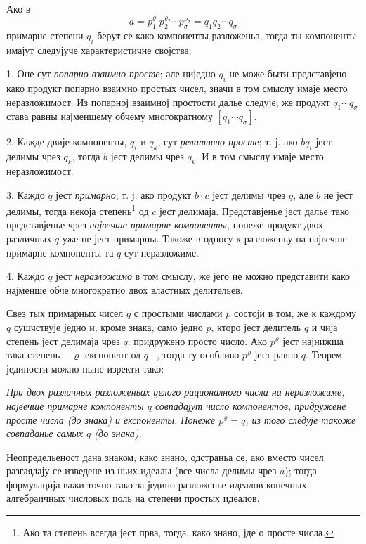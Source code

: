 ﻿\documentclass[11pt]{article}
\begin{document}
Ако в
\[
 a=p_1^{\varrho_1}p_2^{\varrho_2}\cdots p_\sigma^{\varrho_\sigma}=q_1q_2\cdots q_\sigma
\]
примарне степени \(q_i\) берут се како компоненты разложеньа, тогда ты компоненты имајут следујуче характеристичне својства:

1. Оне сут \emph{попарно взаимно просте}; але ниједно \(q_i\) не може быти представјено како продукт попарно взаимно простых чисел, значи в том смыслу имаје место неразложимост. Из попарној взаимној простости далье следује, же продукт \(q_1\cdots q_\sigma\) става равны најменшему обчему многократному \([q_1\cdots q_\sigma]\).

2. Кажде двије компоненты, \(q_i\) и \(q_k\), сут \emph{релативно просте}; т. ј. ако \(bq_i\) јест делимы чрез \(q_k\), тогда \(b\) јест делимы чрез \(q_k\). И в том смыслу имаје место неразложимост.

3. Каждо \(q\) јест \emph{примарно}; т. ј. ако продукт \(b\cdot c\) јест делимы чрез \(q\), але \(b\) не јест делимы, тогда некоја степень\footnote{Ако та степень всегда јест прва, тогда, како знано, јде о просте числа.} од \(c\) јест делимаја. Представјенье јест далье тако представјенье чрез \emph{највечше примарне компоненты}, понеже продукт двох различных \(q\) уже не јест примарны. Такоже в односу к разложеньу на највечше примарне компоненты та \(q\) сут неразложиме.

4. Каждо \(q\) јест \emph{неразложимо} в том смыслу, же јего не можно представити како најменше обче многократно двох властных делительев.

Свез тых примарных чисел \(q\) с простыми числами \(p\) состоји в том, же к каждому \(q\) сушчствује једно и, кроме знака, само једно \(p\), кторо јест делитель \(q\) и чија степень јест делимаја чрез \(q\): придружено просто число. Ако \(p^\varrho\) јест најнижша така степень -- \(\varrho\) експонент од \(q\) --, тогда ту особливо \(p^\varrho\) јест равно \(q\). Теорем јединости можно ныне изректи тако:

\emph{При двох различных разложеньах целого рационалного числа на неразложиме, највечше примарне компоненты \(q\) совпадајут число компонентов, придружене просте числа (до знака) и експоненты. Понеже \(p^\varrho=q\), из того следује такоже совпаданье самых \(q\) (до знака).}

Неопредельеност дана знаком, како знано, одстраньа се, ако вместо чисел разглядају се изведене из ньих идеалы (все числа делимы чрез \(a\)); тогда формулација важи точно тако за једино разложенье идеалов конечных алгебраичных числовых поль на степени простых идеалов.
\end{document}
